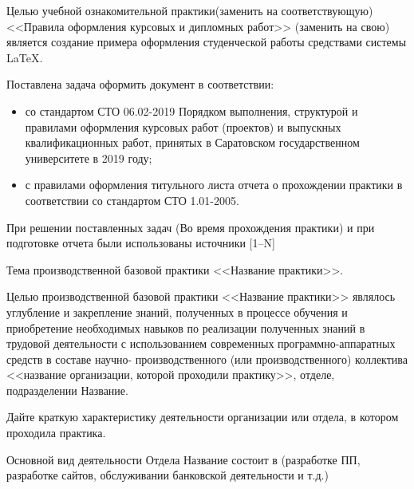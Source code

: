 \documentclass[bachelor, och, coursework, times]{SCWorks}
\begin{document}

Целью учебной ознакомительной практики(заменить на соответствующую) <<Правила оформления курсовых и дипломных работ>> (заменить на свою) является создание примера оформления студенческой работы средствами системы \LaTeX.

Поставлена задача оформить документ в соответствии:
\begin{itemize}
    \item со стандартом СТО 06.02-2019 Порядком выполнения, структурой и правилами оформления курсовых работ (проектов)
    и выпускных квалификационных работ, принятых в Саратовском государственном университете в 2019 году;
    \item с правилами оформления титульного листа отчета о прохождении практики в соответствии со стандартом СТО 1.01-2005.
\end{itemize}

При решении поставленных задач (Во время прохождения практики) и при подготовке отчета были использованы источники [1--N]

Тема производственной базовой практики <<Название практики>>.

Целью производственной базовой практики <<Название  практики>>  являлось углубление и закрепление знаний, полученных в процессе обучения и приобретение необходимых навыков
по реализации полученных знаний в трудовой деятельности с использованием современных программно-аппаратных средств в составе научно-
производственного (или производственного) коллектива <<название организации, которой проходили практику>>, отделе, подразделении Название.

 Дайте краткую характеристику деятельности организации или отдела, в котором проходила практика.

 Основной вид деятельности Отдела Название состоит в (разработке ПП, разработке сайтов, обслуживании банковской деятельности и т.д.)
\end{document}
